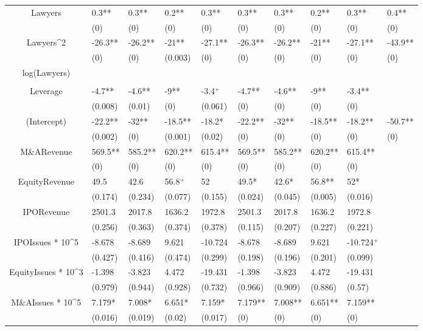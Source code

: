 \documentclass{article}
\begin{document}
\begin{table}[H]
\begin{tabular}{|clllllllll|}
Lawyers & 0.3** & 0.3** & 0.2** & 0.3** & 0.3** & 0.3** & 0.2** & 0.3** & 0.4** \\ 
   & (0) & (0) & (0) & (0) & (0) & (0) & (0) & (0) & (0) \\ 
  Lawyers^2 & -26.3** & -26.2** & -21** & -27.1** & -26.3** & -26.2** & -21** & -27.1** & -43.9** \\ 
   & (0) & (0) & (0.003) & (0) & (0) & (0) & (0) & (0) & (0) \\ 
  log(Lawyers) &  &  &  &  &  &  &  &  &  \\ 
   &  &  &  &  &  &  &  &  &  \\ 
  Leverage & -4.7** & -4.6** & -9** & -3.4$^{+}$ & -4.7** & -4.6** & -9** & -3.4** &  \\ 
   & (0.008) & (0.01) & (0) & (0.061) & (0) & (0) & (0) & (0) &  \\ 
  (Intercept) & -22.2** & -32** & -18.5** & -18.2* & -22.2** & -32** & -18.5** & -18.2** & -50.7** \\ 
   & (0.002) & (0) & (0.001) & (0.02) & (0) & (0) & (0) & (0) & (0) \\ 
  M\&ARevenue & 569.5** & 585.2** & 620.2** & 615.4** & 569.5** & 585.2** & 620.2** & 615.4** &  \\ 
   & (0) & (0) & (0) & (0) & (0) & (0) & (0) & (0) &  \\ 
  EquityRevenue & 49.5 & 42.6 & 56.8$^{+}$ & 52 & 49.5* & 42.6* & 56.8** & 52* &  \\ 
   & (0.174) & (0.234) & (0.077) & (0.155) & (0.024) & (0.045) & (0.005) & (0.016) &  \\ 
  IPORevenue & 2501.3 & 2017.8 & 1636.2 & 1972.8 & 2501.3 & 2017.8 & 1636.2 & 1972.8 &  \\ 
   & (0.256) & (0.363) & (0.374) & (0.378) & (0.115) & (0.207) & (0.227) & (0.221) &  \\ 
  IPOIssues * 10^5 & -8.678 & -8.689 & 9.621 & -10.724 & -8.678 & -8.689 & 9.621 & -10.724$^{+}$ &  \\ 
   & (0.427) & (0.416) & (0.474) & (0.299) & (0.198) & (0.196) & (0.201) & (0.099) &  \\ 
  EquityIssues * 10^3 & -1.398 & -3.823 & 4.472 & -19.431 & -1.398 & -3.823 & 4.472 & -19.431 &  \\ 
   & (0.979) & (0.944) & (0.928) & (0.732) & (0.966) & (0.909) & (0.886) & (0.57) &  \\ 
  M\&AIssues * 10^5 & 7.179* & 7.008* & 6.651* & 7.159* & 7.179** & 7.008** & 6.651** & 7.159** &  \\ 
   & (0.016) & (0.019) & (0.02) & (0.017) & (0) & (0) & (0) & (0) &  \\ 

\end{tabular}
\end{table}
\end{document}
